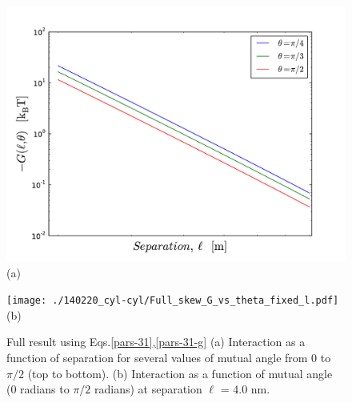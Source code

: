 \documentclass[onecolumn,letterpaper,amsmath,amssymb,floatfix,aps,superscriptaddress]{revtex4}
\begin{document}
\begin{figure}[t!]
\begin{center}
\begin{minipage}[b]{0.40\textwidth}
\begin{center}
\includegraphics[width=1.2\textwidth]{./140220_cyl-cyl/Full_skew_G_vs_l.pdf} (a)
\end{center}
\end{minipage}
\hskip 43pt
\begin{minipage}[b]{0.40\textwidth}
\begin{center}
\texttt{[image: ./140220\_cyl-cyl/Full\_skew\_G\_vs\_theta\_fixed\_l.pdf]} (b)
\end{center}
\end{minipage}
\caption{Full result using Eqs.\ref{pars-31},\ref{pars-31-g} (a) Interaction as a function of separation for several values of mutual angle from 0 to $\pi/2$ (top to bottom). (b) Interaction as a function of mutual angle (0 radians to $\pi/2$ radians) at separation $\ell$ = 4.0 nm. }
\label{fiddle1}
\end{center}
\end{figure} 
\end{document}

